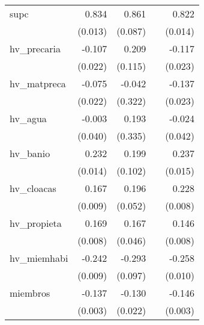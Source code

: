 {\begin{longtable}{l*{4}{D{.}{.}{-1}}}
\addlinespace
supc        &       0.834\sym{***}&       0.861\sym{***}&                     &       0.822\sym{***}\\
            &     (0.013)         &     (0.087)         &                     &     (0.014)         \\
\addlinespace
hv\_precaria &      -0.107\sym{***}&       0.209         &                     &      -0.117\sym{***}\\
            &     (0.022)         &     (0.115)         &                     &     (0.023)         \\
\addlinespace
hv\_matpreca &      -0.075\sym{***}&      -0.042         &                     &      -0.137\sym{***}\\
            &     (0.022)         &     (0.322)         &                     &     (0.023)         \\
\addlinespace
hv\_agua     &      -0.003         &       0.193         &                     &      -0.024         \\
            &     (0.040)         &     (0.335)         &                     &     (0.042)         \\
\addlinespace
hv\_banio    &       0.232\sym{***}&       0.199         &                     &       0.237\sym{***}\\
            &     (0.014)         &     (0.102)         &                     &     (0.015)         \\
\addlinespace
hv\_cloacas  &       0.167\sym{***}&       0.196\sym{***}&                     &       0.228\sym{***}\\
            &     (0.009)         &     (0.052)         &                     &     (0.008)         \\
\addlinespace
hv\_propieta &       0.169\sym{***}&       0.167\sym{***}&                     &       0.146\sym{***}\\
            &     (0.008)         &     (0.046)         &                     &     (0.008)         \\
\addlinespace
hv\_miemhabi &      -0.242\sym{***}&      -0.293\sym{**} &                     &      -0.258\sym{***}\\
            &     (0.009)         &     (0.097)         &                     &     (0.010)         \\
\addlinespace
miembros    &      -0.137\sym{***}&      -0.130\sym{***}&                     &      -0.146\sym{***}\\
            &     (0.003)         &     (0.022)         &                     &     (0.003)         \\

\end{longtable}}
